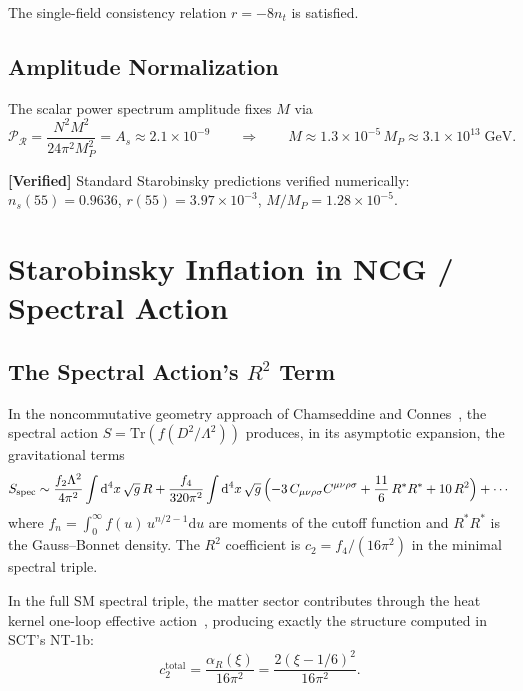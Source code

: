\documentclass[11pt,a4paper]{article}
\newcommand{\Rsq}{R^2}
\newcommand{\Weylsq}{C_{\mu\nu\rho\sigma}C^{\mu\nu\rho\sigma}}
\renewcommand{\dd}{\mathrm{d}}
\theoremstyle{plain}
\theoremstyle{definition}
\newcommand{\verified}[1]{%
  \par\smallskip\noindent
  \colorbox{green!10}{\parbox{\dimexpr\linewidth-2\fboxsep}{%
    \textcolor{green!50!black}{\textbf{[Verified]}} #1}}%
  \par\smallskip}
\begin{document}
The single-field consistency relation $r = -8n_t$ is satisfied.

\subsection{Amplitude Normalization}

The scalar power spectrum amplitude fixes $M$ via~\cite{Mukhanov81}
\begin{equation}\label{eq:As}
  \mathcal{P}_{\mathcal{R}} = \frac{N^2 M^2}{24\pi^2 M_P^2}
  = A_s \approx 2.1 \times 10^{-9}
  \qquad\Longrightarrow\qquad
  M \approx 1.3 \times 10^{-5}\,M_P \approx 3.1 \times 10^{13}\;\text{GeV}.
\end{equation}

\verified{Standard Starobinsky predictions verified numerically:
$n_s(55) = 0.9636$, $r(55) = 3.97 \times 10^{-3}$,
$M/M_P = 1.28 \times 10^{-5}$.}

\section{Starobinsky Inflation in NCG / Spectral Action}
\label{sec:ncg}

\subsection{The Spectral Action's $R^2$ Term}

In the noncommutative geometry approach of Chamseddine and
Connes~\cite{CC97,CC06}, the spectral action
$S = \mathrm{Tr}(f(D^2/\Lambda^2))$ produces, in its asymptotic
expansion, the gravitational terms
\begin{equation}\label{eq:spectral-expansion}
  S_{\mathrm{spec}} \sim \frac{f_2\Lambda^2}{4\pi^2}\int \dd^4 x\,\sqrt{g}\,R
  + \frac{f_4}{320\pi^2}\int \dd^4 x\,\sqrt{g}\,
  \Bigl(-3\,\Weylsq + \frac{11}{6}\,R^*R^*
  + 10\,\Rsq\Bigr) + \cdots
\end{equation}
where $f_n = \int_0^\infty f(u)\,u^{n/2-1}\dd u$ are moments of the
cutoff function and $R^*R^*$ is the Gauss--Bonnet density. The $R^2$
coefficient is $c_2 = f_4/(16\pi^2)$ in the minimal spectral triple.

In the full SM spectral triple, the matter sector contributes through
the heat kernel one-loop effective action~\cite{CC12,CCS13}, producing
exactly the structure computed in SCT's NT-1b:
\begin{equation}\label{eq:c2-sct}
  c_2^{\mathrm{total}} = \frac{\alpha_R(\xi)}{16\pi^2}
  = \frac{2(\xi - 1/6)^2}{16\pi^2}.
\end{equation}
\end{document}
